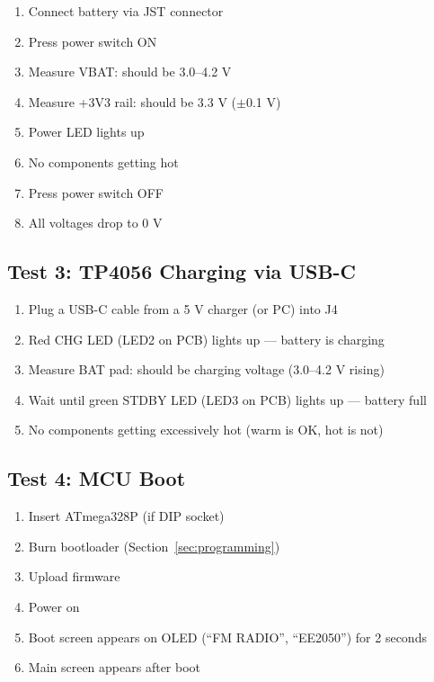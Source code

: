 \documentclass[a4paper,11pt]{article}
\renewcommand*{\,}{ }%
\begin{document}
\begin{enumerate}
    \item Connect battery via JST connector
    \item Press power switch ON
    \item[$\square$] Measure VBAT: should be 3.0--4.2\,V
    \item[$\square$] Measure +3V3 rail: should be 3.3\,V ($\pm$0.1\,V)
    \item[$\square$] Power LED lights up
    \item[$\square$] No components getting hot
    \item Press power switch OFF
    \item[$\square$] All voltages drop to 0\,V
\end{enumerate}

\subsection{Test 3: TP4056 Charging via USB-C}

\begin{enumerate}
    \item Plug a USB-C cable from a 5\,V charger (or PC) into J4
    \item[$\square$] Red CHG LED (LED2 on PCB) lights up --- battery is charging
    \item[$\square$] Measure BAT pad: should be charging voltage (3.0--4.2\,V rising)
    \item Wait until green STDBY LED (LED3 on PCB) lights up --- battery full
    \item[$\square$] No components getting excessively hot (warm is OK, hot is not)
\end{enumerate}

\subsection{Test 4: MCU Boot}

\begin{enumerate}
    \item Insert ATmega328P (if DIP socket)
    \item Burn bootloader (Section~\ref{sec:programming})
    \item Upload firmware
    \item Power on
    \item[$\square$] Boot screen appears on OLED (``FM RADIO'', ``EE2050'') for 2 seconds
    \item[$\square$] Main screen appears after boot
\end{enumerate}
\end{document}
